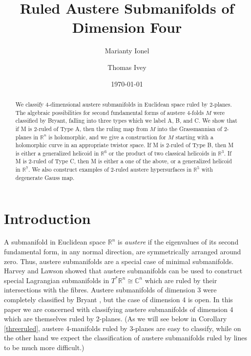 \documentclass[12pt,reqno]{amsart}
\theoremstyle{definition}
\theoremstyle{remark}
\begin{document}
\title{Ruled Austere Submanifolds of Dimension Four}
\author{Marianty Ionel}
\address{Department of Mathematics, University of Toledo, Toledo, OH; \hskip7in  Of \indent Institute of Mathematics, Federal University of Rio de Janeiro, Brazil}
\author{Thomas Ivey}
\address{Dept. of Mathematics, College of Charleston, Charleston SC 29424}


\begin{abstract}
We classify 4-dimensional austere submanifolds in Euclidean space ruled by 2-planes.
The algebraic possibilities for second fundamental forms of austere 4-folds $M$ were classified by Bryant, falling into three types which we label A, B, and C.
We show that if M is 2-ruled of Type A, then the ruling map from $M$ into the Grassmannian of 2-planes in ${\mathbb R}^n$ is holomorphic, and we give a construction for $M$ starting with a holomorphic curve in an appropriate twistor space.
If M is 2-ruled of Type B, then M is either a generalized helicoid in ${\mathbb R}^6$ or the product of two classical helicoids in ${\mathbb R}^3$.
If M is 2-ruled of Type C, then M is either a one of the above, or a generalized helicoid in ${\mathbb R}^7$.
We also construct examples of 2-ruled austere hypersurfaces in ${\mathbb R}^5$ with degenerate Gauss map.
\end{abstract}

\date{\today}
\maketitle

\section{Introduction}
A submanifold in Euclidean space ${\mathbb R}^n$ is {\em austere} if the eigenvalues of
its second fundamental form, in any normal direction, are symmetrically arranged around zero.
Thus, austere submanifolds are a special case of minimal submanifolds.
Harvey and Lawson \cite{HL} showed that austere submanifolds can be used to construct
special Lagrangian submanifolds in $T^*{\mathbb R}^n \cong {\mathbb C}^n$ which are ruled by their intersections
with the fibres.  Austere submanifolds of dimension 3 were completely classified by Bryant
\cite{Baustere}, but the case of dimension 4 is open.  In this paper we are concerned
with classifying austere submanifolds of dimension 4 which are themselves ruled by 2-planes.
(As we will see below in Corollary \ref{threeruled}, austere 4-manifolds ruled by 3-planes are easy to classify,
while on the other hand we expect the classification of austere submanifolds ruled by lines to be much more difficult.)
\end{document}
